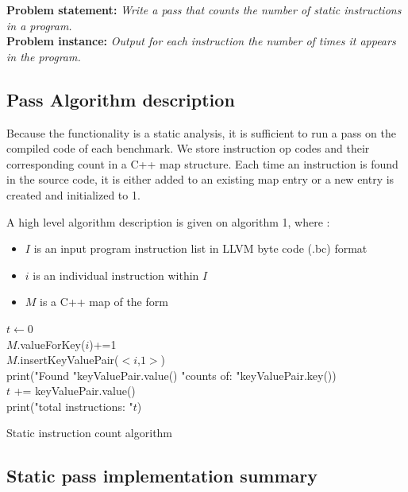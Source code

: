 
\textbf{Problem statement: } \textit{Write a pass that counts the number of static instructions in a program.} \\
\textbf{Problem instance:} \textit{Output for each instruction the number of times it appears in the program.}

\subsection{Pass Algorithm description}

Because the functionality is a static analysis, it is sufficient to run a pass on the compiled code of each benchmark.
We store instruction op codes and their corresponding count in a C++ map structure. Each time an instruction is found in the source code, it is either added to an existing map entry or a new entry is created and initialized to 1.

A high level algorithm description is given on algorithm 1, where :
\begin{itemize}
\item {$I$ is an input program instruction list in LLVM byte code (.bc) format}
\item{$i$ is an individual instruction within $I$}
\item{$M$ is a C++ map of the form }
\end{itemize}

\begin{algorithm}
 $t \gets 0$\\
 { 
 	{
 		$M$.valueForKey($i$)+=1\\
 	}
 	\Else
 	{
 		$M$.insertKeyValuePair($<i$,$1>$)\\
 	}
 }
 {
 	print("Found "keyValuePair.value() "counts of: "keyValuePair.key())\\
 	$t$ += keyValuePair.value()\\
 }
 print("total instructions: "$t$)
 \caption{Static instruction count algorithm}
\end{algorithm}

\subsection{Static pass implementation summary}

